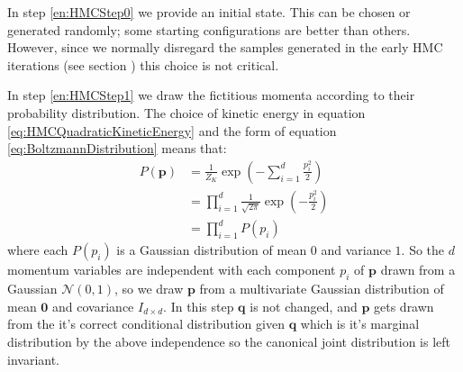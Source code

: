 \documentclass[12pt]{article}
\begin{document}
            In step \ref{en:HMCStep0} we provide an initial state. This can be chosen or generated randomly; some starting configurations are better than others. However, since we normally disregard the samples generated in the early HMC iterations (see section ) this choice is not critical. 

            In step \ref{en:HMCStep1} we draw the fictitious momenta according to their probability distribution. The choice of kinetic energy in equation \ref{eq:HMCQuadraticKineticEnergy} and the form of equation \ref{eq:BoltzmannDistribution} means that:
            \begin{align}
                \label{eq:KineticBoltzmannDistribution}
                P\left(\bm{p}\right) & = \frac{1}{Z_K}\exp{\left(-\sum_{i=1}^{d}\frac{p_i^2}{2}\right)} \\
                                     & = \prod_{i=1}^d\frac{1}{\sqrt{2\pi}} \exp{\left(-\frac{p_i^2}{2}\right)} \\
                                     & = \prod_{i=1}^dP\left(p_i\right)
            \end{align}
            where each $P\left(p_i\right)$ is a Gaussian distribution of mean $0$ and variance $1$. So the $d$ momentum variables are independent with each component $p_i$ of $\bm{p}$ drawn from a Gaussian $\mathcal{N}{\left(0,1\right)}$, so we draw $\bm{p}$ from a multivariate Gaussian distribution of mean $\bm{0}$ and covariance $I_{d\times d}$. In this step $\bm{q}$ is not changed, and $\bm{p}$ gets drawn from the it's correct conditional distribution given $\bm{q}$ which is it's marginal distribution by the above independence so the canonical joint distribution is left invariant.
\end{document}
